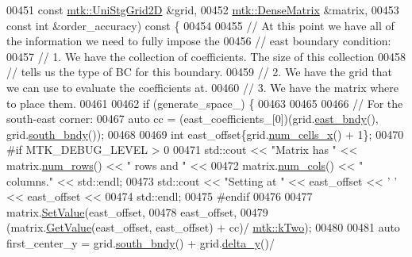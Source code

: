 \begin{DoxyCode}
00451     \textcolor{keyword}{const} \hyperlink{classmtk_1_1UniStgGrid2D}{mtk::UniStgGrid2D} &grid,
00452     \hyperlink{classmtk_1_1DenseMatrix}{mtk::DenseMatrix} &matrix,
00453     \textcolor{keyword}{const} \textcolor{keywordtype}{int} &order\_accuracy)\textcolor{keyword}{ const }\{
00454 
00455   \textcolor{comment}{// At this point we have all of the information we need to fully impose the}
00456   \textcolor{comment}{// east boundary condition:}
00457   \textcolor{comment}{// 1. We have the collection of coefficients. The size of this collection}
00458   \textcolor{comment}{// tells us the type of BC for this boundary.}
00459   \textcolor{comment}{// 2. We have the grid that we can use to evaluate the coefficients at.}
00460   \textcolor{comment}{// 3. We have the matrix where to place them.}
00461 
00462   \textcolor{keywordflow}{if} (generate\_space\_) \{
00463 
00465 
00466     \textcolor{comment}{// For the south-east corner:}
00467     \textcolor{keyword}{auto} cc = (east\_coefficients\_[0])(grid.\hyperlink{classmtk_1_1UniStgGrid2D_a03f689eb29a6369b82ce1207c655d5ff}{east\_bndy}(), grid.\hyperlink{classmtk_1_1UniStgGrid2D_a1442eaf219f099d0ebf46a170fdebf92}{south\_bndy}());
00468 
00469     \textcolor{keywordtype}{int} east\_offset\{grid.\hyperlink{classmtk_1_1UniStgGrid2D_a2d182866a398aba8e4829590e85bf939}{num\_cells\_x}() + 1\};
00470 \textcolor{preprocessor}{    #if MTK\_DEBUG\_LEVEL > 0}
00471     std::cout << \textcolor{stringliteral}{"Matrix has "} << matrix.\hyperlink{classmtk_1_1DenseMatrix_a53f3afb3b6a8d21854458aaa9663cc74}{num\_rows}() << \textcolor{stringliteral}{" rows and "} <<
00472       matrix.\hyperlink{classmtk_1_1DenseMatrix_a41747502d468c6728a4be31501b16e0e}{num\_cols}() << \textcolor{stringliteral}{" columns."} << std::endl;
00473     std::cout << \textcolor{stringliteral}{"Setting at "} << east\_offset << \textcolor{charliteral}{' '} << east\_offset <<
00474       std::endl;
00475 \textcolor{preprocessor}{    #endif}
00476 
00477     matrix.\hyperlink{classmtk_1_1DenseMatrix_a784ce5784109ac86bfb9d8562b334b13}{SetValue}(east\_offset,
00478                     east\_offset,
00479                     (matrix.\hyperlink{classmtk_1_1DenseMatrix_a4b23ecbebd970b5eea915dbb50691024}{GetValue}(east\_offset, east\_offset) + cc)/
      \hyperlink{group__c01-roots_gaf39c2d851a2db744f4feb1c5ab3ec2cf}{mtk::kTwo});
00480 
00481     \textcolor{keyword}{auto} first\_center\_y = grid.\hyperlink{classmtk_1_1UniStgGrid2D_a1442eaf219f099d0ebf46a170fdebf92}{south\_bndy}() + grid.\hyperlink{classmtk_1_1UniStgGrid2D_a65a78cfc80ffdbeb282ed57af4dc5cb4}{delta\_y}()/

\end{DoxyCode}

